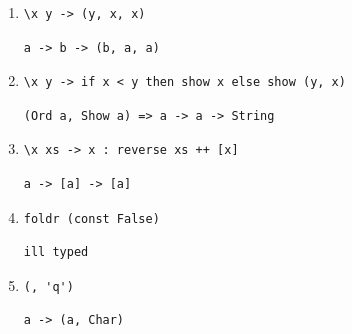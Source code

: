 \documentclass[11pt]{article}
\begin{document}
\begin{enumerate}
\item
\begin{minipage}[t]{\linewidth}
\vspace{-\baselineskip}
\begin{lstlisting}
\x y -> (y, x, x)
\end{lstlisting}
\begin{lstlisting}[style=answer]
a -> b -> (b, a, a)
\end{lstlisting}
\end{minipage}

\item
\begin{minipage}[t]{\linewidth}
\vspace{-\baselineskip}
\begin{lstlisting}
\x y -> if x < y then show x else show (y, x)
\end{lstlisting}
\begin{lstlisting}[style=answer]
(Ord a, Show a) => a -> a -> String
\end{lstlisting}
\end{minipage}

\item
\begin{minipage}[t]{\linewidth}
\vspace{-\baselineskip}
\begin{lstlisting}
\x xs -> x : reverse xs ++ [x]
\end{lstlisting}
\begin{lstlisting}[style=answer]
a -> [a] -> [a]
\end{lstlisting}
\end{minipage}

\item
\begin{minipage}[t]{\linewidth}
\vspace{-\baselineskip}
\begin{lstlisting}
foldr (const False)
\end{lstlisting}
\begin{lstlisting}[style=answer]
ill typed
\end{lstlisting}
\end{minipage}

\item
\begin{minipage}[t]{\linewidth}
\vspace{-\baselineskip}
\begin{lstlisting}
(, 'q')
\end{lstlisting}
\begin{lstlisting}[style=answer]
a -> (a, Char)
\end{lstlisting}
\end{minipage}


\end{enumerate}
\end{document}
